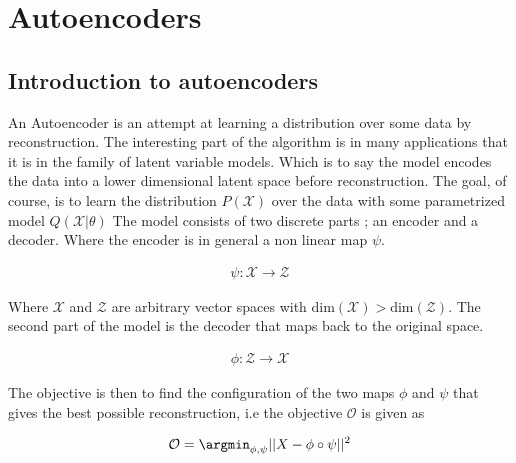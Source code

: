 
\section{Autoencoders}\label{sec:autoencoder}


\subsection{Introduction to autoencoders}\label{sec:intro_autoenc}
An Autoencoder is an attempt at learning a distribution over some data by reconstruction. The interesting part of the algorithm is in many applications that it is in the family of latent variable models. Which is to say the model encodes the data into a lower dimensional latent space before reconstruction. The goal, of course, is to learn the distribution $P(\mathcal{X})$ over the data with some parametrized model $Q(\mathcal{X}|\theta)$
The model consists of two discrete parts ; an encoder and a decoder.
Where the encoder is in general a non linear map $\psi$. 

\begin{align*}
  \psi: \mathcal{X} \rightarrow \mathcal{Z}
\end{align*}

\noindent Where $\mathcal{X} $ and $\mathcal{Z}$ are arbitrary vector spaces with $\text{dim}(\mathcal{X}) > \text{dim}(\mathcal{Z})$.
The second part of the model is the decoder that maps back to the original space.


\begin{align*}
  \phi: \mathcal{Z} \rightarrow \mathcal{X}
\end{align*}

\noindent The objective is then to find the configuration of the two maps $\phi$ and $\psi$
that gives the best possible reconstruction, i.e the objective $\mathcal{O}$ is given as

\begin{align}\label{eq:objective_autoenc}
  \mathcal{O} = \argmin_{\phi, \psi} || X - \phi \circ \psi||^2
\end{align}

